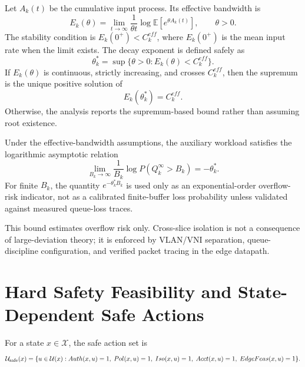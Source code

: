 Let $A_k(t)$ be the cumulative input process. Its effective bandwidth is
\begin{equation}
  E_k(\theta)
  =
  \lim_{t\to\infty}
  \frac{1}{\theta t}
  \log\mathbb{E}\left[e^{\theta A_k(t)}\right],
  \qquad \theta>0.
  \label{eq:eff-bw-def}
\end{equation}
The stability condition is $E_k(0^+)<C_k^{eff}$, where $E_k(0^+)$ is the mean input
rate when the limit exists. The decay exponent is defined safely as
\begin{equation}
  \theta_k^*
  =
  \sup\{\theta>0:E_k(\theta)<C_k^{eff}\}.
  \label{eq:sup-root}
\end{equation}
If $E_k(\theta)$ is continuous, strictly increasing, and crosses $C_k^{eff}$, then the
supremum is the unique positive solution of
\begin{equation}
  E_k(\theta_k^*)=C_k^{eff}.
  \label{eq:root-conditional}
\end{equation}
Otherwise, the analysis reports the supremum-based bound rather than assuming root
existence.

Under the effective-bandwidth assumptions, the auxiliary workload satisfies the
logarithmic asymptotic relation
\begin{equation}
  \lim_{B_k\to\infty}
  \frac{1}{B_k}
  \log P(Q_k^{\infty}>B_k)
  =
  -\theta_k^*.
  \label{eq:ldt-asymptotic}
\end{equation}
For finite $B_k$, the quantity $e^{-\theta_k^*B_k}$ is used only as an
exponential-order overflow-risk indicator, not as a calibrated finite-buffer loss
probability unless validated against measured queue-loss traces.

This bound estimates overflow risk only. Cross-slice isolation is not a consequence of
large-deviation theory; it is enforced by VLAN/VNI separation, queue-discipline
configuration, and verified packet tracing in the edge datapath.

\section{Hard Safety Feasibility and State-Dependent Safe Actions}
\label{sec:pisafe}

\begin{definition}
For a state $x\in\mathcal{X}$, the safe action set is
\begin{equation}
  \mathcal{U}_{\mathrm{safe}}(x)=
  \{u\in\mathcal{U}(x):
  Auth(x,u)=1,\;
  Pol(x,u)=1,\;
  Iso(x,u)=1,\;
  Acct(x,u)=1,\;
  EdgeFeas(x,u)=1\}.
  \label{eq:usafe-state}
\end{equation}
\end{definition}

